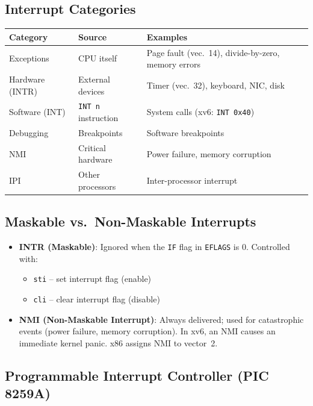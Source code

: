 \documentclass[11pt,a4paper]{article}
\newcommand{\term}[1]{\textbf{#1}}
\newcommand{\code}[1]{\texttt{#1}}
\newcommand{\xv}{xv6}
\begin{document}
\subsection{Interrupt Categories}

\begin{center}
\begin{tabular}{lll}
  \toprule
  \textbf{Category} & \textbf{Source} & \textbf{Examples} \\
  \midrule
  Exceptions       & CPU itself           & Page fault (vec.~14), divide-by-zero, memory errors \\
  Hardware (INTR)  & External devices     & Timer (vec.~32), keyboard, NIC, disk \\
  Software (INT)   & \code{INT n} instruction & System calls (\xv: \code{INT 0x40}) \\
  Debugging        & Breakpoints          & Software breakpoints \\
  NMI              & Critical hardware    & Power failure, memory corruption \\
  IPI              & Other processors     & Inter-processor interrupt \\
  \bottomrule
\end{tabular}
\end{center}

\subsection{Maskable vs.\ Non-Maskable Interrupts}

\begin{itemize}
  \item \term{INTR (Maskable)}: Ignored when the \code{IF} flag in \code{EFLAGS}
    is 0.  Controlled with:
    \begin{itemize}
      \item \code{sti} -- set interrupt flag (enable)
      \item \code{cli} -- clear interrupt flag (disable)
    \end{itemize}
  \item \term{NMI (Non-Maskable Interrupt)}: Always delivered; used for
    catastrophic events (power failure, memory corruption).  In \xv, an NMI
    causes an immediate kernel panic.  x86 assigns NMI to vector~2.
\end{itemize}

\subsection{Programmable Interrupt Controller (PIC 8259A)}
\end{document}
